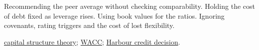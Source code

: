 \begin{qfmethod}
 Recommending the peer average without checking comparability. Holding the cost of debt fixed as leverage rises. Using book values for the ratios. Ignoring covenants, rating triggers and the cost of lost flexibility.

 \hyperref[mod:capital-structure-theory]{capital structure theory}; \hyperref[meth:wacc-calculation]{WACC}; \hyperref[ex:integrated-credit-decision]{Harbour credit decision}.

\end{qfmethod}
